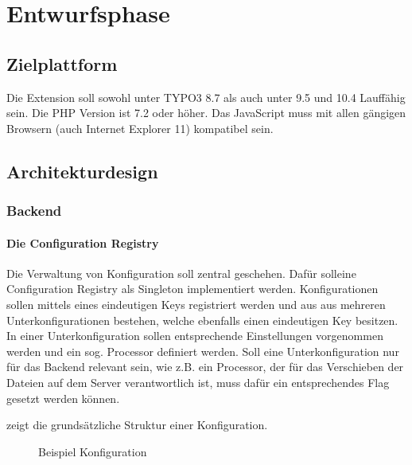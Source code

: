 \section{Entwurfsphase} 
\label{sec:Entwurfsphase}

\subsection{Zielplattform}
\label{sec:Zielplattform}

Die Extension soll sowohl unter TYPO3 8.7 als auch unter 9.5 und 10.4 Lauffähig sein. Die PHP Version ist 7.2 oder höher. Das JavaScript muss mit allen gängigen Browsern (auch Internet Explorer 11) kompatibel sein.


\subsection{Architekturdesign}
\label{sec:Architekturdesign}

\subsubsection{Backend}
\label{sec:Backend}

\paragraph{Die Configuration Registry} Die Verwaltung von Konfiguration soll zentral geschehen. Dafür solleine Configuration Registry als Singleton implementiert werden. Konfigurationen sollen mittels eines eindeutigen Keys registriert werden und aus  aus mehreren Unterkonfigurationen bestehen, welche ebenfalls einen eindeutigen Key besitzen. In einer Unterkonfiguration sollen entsprechende Einstellungen vorgenommen werden und ein sog. Processor definiert werden. Soll eine Unterkonfiguration nur für das Backend relevant sein, wie z.B. ein Processor, der für das Verschieben der Dateien auf dem Server verantwortlich ist, muss dafür ein entsprechendes Flag gesetzt werden können. 

\pagebreak

 zeigt die grundsätzliche Struktur einer Konfiguration.
\begin{figure}[htb]
\centering
{}
\caption{Beispiel Konfiguration}
\label{fig:beispiel_konfiguration}
\end{figure}

